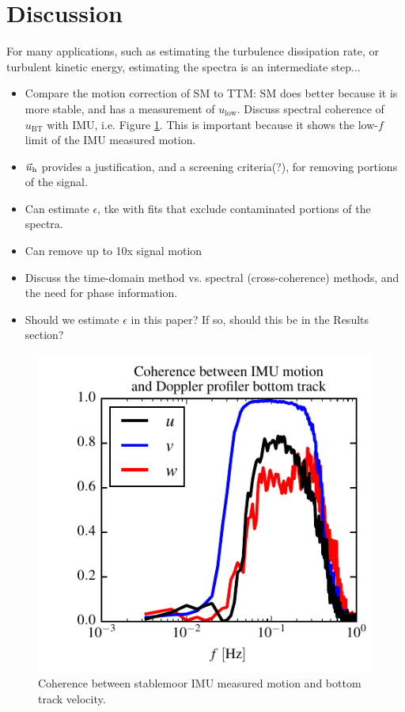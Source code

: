 \documentclass[twocol]{ametsoc}
\begin{document}
\section{Discussion}

For many applications, such as estimating the turbulence dissipation rate, or turbulent kinetic energy, estimating the spectra is an intermediate step...
\begin{itemize}
\item Compare the motion correction of SM to TTM: SM does better because it is more stable, and has a measurement of $u_\mathrm{low}$. Discuss spectral coherence of $u_\mathrm{BT}$ with IMU, i.e. Figure \ref{fig:SM_coh}. This is important because it shows the low-$f$ limit of the IMU measured motion.
\item $\vec{u}_\mathrm{h}$ provides a justification, and a screening criteria(?), for removing portions of the signal.
\item Can estimate $\epsilon$, tke with fits that exclude contaminated portions of the spectra.
\item Can remove up to 10x signal motion
\item Discuss the time-domain method vs. spectral (cross-coherence) methods, and the need for phase information.
\item Should we estimate $\epsilon$ in this paper? If so, should this be in the Results section?
\end{itemize}

\begin{figure}[t]
  \centering
  \includegraphics{BT_IMU_Coherence02}
  \caption{Coherence between stablemoor IMU measured motion and bottom track velocity.}
  \label{fig:SM_coh}
\end{figure}
\end{document}
